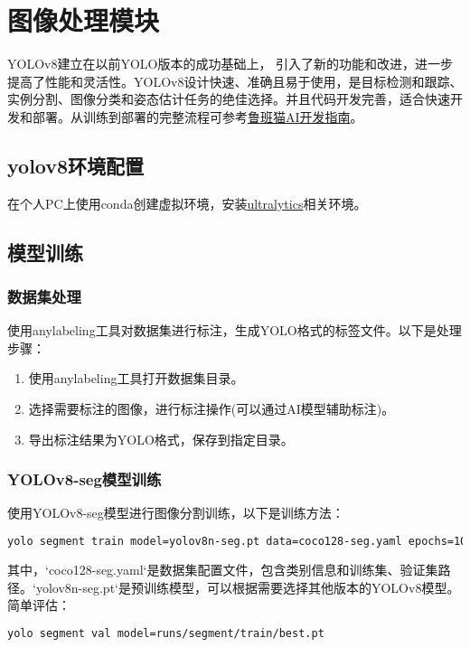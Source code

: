 \chapter{图像处理模块}
YOLOv8建立在以前YOLO版本的成功基础上， 引入了新的功能和改进，进一步提高了性能和灵活性。YOLOv8设计快速、准确且易于使用，是目标检测和跟踪、实例分割、图像分类和姿态估计任务的绝佳选择。并且代码开发完善，适合快速开发和部署。从训练到部署的完整流程可参考\href{https://doc.embedfire.com/linux/rk356x/Ai/zh/latest/lubancat_ai/example/yolov8.html}{鲁班猫AI开发指南}。
\section{yolov8环境配置}
在个人PC上使用conda创建虚拟环境，安装\href{https://github.com/ultralytics/ultralytics}{ultralytics}相关环境。
\section{模型训练}

\subsection{数据集处理}
使用anylabeling工具对数据集进行标注，生成YOLO格式的标签文件。以下是处理步骤：
\begin{enumerate}
    \item 使用anylabeling工具打开数据集目录。
    \item 选择需要标注的图像，进行标注操作(可以通过AI模型辅助标注)。
    \item 导出标注结果为YOLO格式，保存到指定目录。
\end{enumerate}
\subsection{YOLOv8-seg模型训练}
使用YOLOv8-seg模型进行图像分割训练，以下是训练方法：
\begin{lstlisting}[language=bash, basicstyle=\ttfamily\small, keywordstyle=\color{blue}, breaklines=true]
yolo segment train model=yolov8n-seg.pt data=coco128-seg.yaml epochs=100 imgsz=640
\end{lstlisting}
其中，`coco128-seg.yaml`是数据集配置文件，包含类别信息和训练集、验证集路径。`yolov8n-seg.pt`是预训练模型，可以根据需要选择其他版本的YOLOv8模型。
简单评估：
\begin{lstlisting}[language=bash, basicstyle=\ttfamily\small, keywordstyle=\color{blue}, breaklines=true]
yolo segment val model=runs/segment/train/best.pt
\end{lstlisting}
